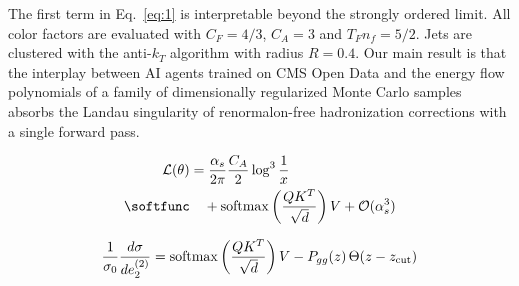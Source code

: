 The first term in Eq.~\eqref{eq:1} is interpretable beyond the strongly
ordered limit. All color factors are evaluated with $C_F = 4/3$, $C_A =
3$ and $T_F n_f = 5/2$. Jets are clustered with the anti-$k_T$ algorithm
with radius $R = 0.4$. Our main result is that the interplay between AI
agents trained on CMS Open Data and the energy flow polynomials of a
family of dimensionally regularized Monte Carlo samples absorbs the
Landau singularity of renormalon-free hadronization corrections with a
single forward pass.

\begin{align}
  \mathcal{L}(\theta) &= \frac{\as}{2\pi} \frac{\CA}{2} \log^{3} \frac{1}{x} \nonumber \\ \softfunc
  &\quad + \softmax\left(\frac{Q K^T}{\sqrt{d}}\right) V + \mathcal{O}(\as^3) \label{eq:3}
\end{align}

\begin{equation}
  \frac{1}{\sigma_0} \frac{d\sigma}{de_2^{(2)}} = \mathrm{softmax}\left(\frac{Q K^T}{\sqrt{d}}\right) V - P_{gg}(z) \, \Theta(z - z_{\rm cut})
  \label{eq:5}
\end{equation}

